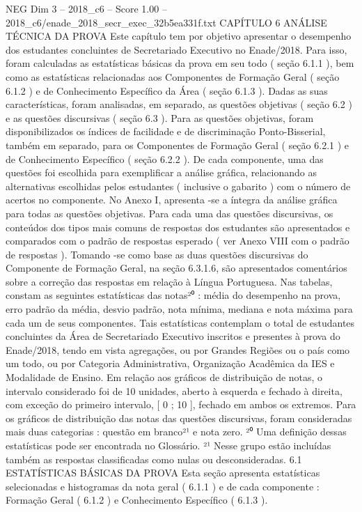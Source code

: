 \begin{textsample}{NEG Dim 3 – 2018\_c6 – Score 1.00 – 2018\_c6/enade\_2018\_secr\_exec\_32b5ea331f.txt}  \label{ex:f3_neg_166}
CAPÍTULO 6 ANÁLISE TÉCNICA DA PROVA Este capítulo tem por objetivo apresentar o desempenho dos estudantes concluintes de Secretariado Executivo no Enade/2018.
Para isso, foram calculadas as estatísticas básicas da prova em seu todo ( seção 6.1.1 ), bem como as estatísticas relacionadas aos Componentes de Formação Geral ( seção 6.1.2 ) e de Conhecimento Específico da Área ( seção 6.1.3 ).
Dadas as suas características, foram analisadas, em separado, as questões objetivas ( seção 6.2 ) e as questões discursivas ( seção 6.3 ).
Para as questões objetivas, foram disponibilizados os índices de facilidade e de discriminação Ponto-Bisserial, também em separado, para os Componentes de Formação Geral ( seção 6.2.1 ) e de Conhecimento Específico ( seção 6.2.2 ).
De cada componente, uma das questões foi escolhida para exemplificar a análise gráfica, relacionando as alternativas escolhidas pelos estudantes ( inclusive o gabarito ) com o número de acertos no componente.
No Anexo I, apresenta -se a íntegra da análise gráfica para todas as questões objetivas.
Para cada uma das questões discursivas, os conteúdos dos tipos mais comuns de respostas dos estudantes são apresentados e comparados com o padrão de respostas esperado ( ver Anexo VIII com o padrão de respostas ).
Tomando -se como base as duas questões discursivas do Componente de Formação Geral, na seção 6.3.1.6, são apresentados comentários sobre a correção das respostas em relação à Língua Portuguesa.
Nas tabelas, constam as seguintes estatísticas das notas²⁰ : média do desempenho na prova, erro padrão da média, desvio padrão, nota mínima, mediana e nota máxima para cada um de seus componentes.
Tais estatísticas contemplam o total de estudantes concluintes da Área de Secretariado Executivo inscritos e presentes à prova do Enade/2018, tendo em vista agregações, ou por Grandes Regiões ou o país como um todo, ou por Categoria Administrativa, Organização Acadêmica da IES e Modalidade de Ensino.
Em relação aos gráficos de distribuição de notas, o intervalo considerado foi de 10 unidades, aberto à esquerda e fechado à direita, com exceção do primeiro intervalo, [ 0 ; 10 ], fechado em ambos os extremos.
Para os gráficos de distribuição das notas das questões discursivas, foram consideradas mais duas categorias : questão em branco²¹ e nota zero. ²⁰ Uma definição dessas estatísticas pode ser encontrada no Glossário. ²¹ Nesse grupo estão incluídas também as respostas classificadas como nulas ou desconsideradas. 6.1 ESTATÍSTICAS BÁSICAS DA PROVA Esta seção apresenta estatísticas selecionadas e histogramas da nota geral ( 6.1.1 ) e de cada componente : Formação Geral ( 6.1.2 ) e Conhecimento Específico ( 6.1.3 ).

\end{textsample}

